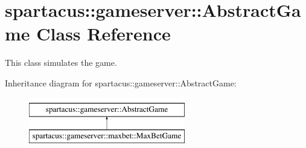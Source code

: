 \hypertarget{classspartacus_1_1gameserver_1_1AbstractGame}{
\section{\-s\-p\-a\-r\-t\-a\-c\-u\-s\-:\-:\-g\-a\-m\-e\-s\-e\-r\-v\-e\-r\-:\-:\-A\-b\-s\-t\-r\-a\-c\-t\-G\-a\-m\-e \-C\-l\-a\-s\-s \-R\-e\-f\-e\-r\-e\-n\-c\-e}
\label{classspartacus_1_1gameserver_1_1AbstractGame}
}


This class simulates the game.  


Inheritance diagram for spartacus::gameserver::AbstractGame:\begin{figure}[H]
\begin{center}
\leavevmode
\includegraphics[height=2.000000cm]{classspartacus_1_1gameserver_1_1AbstractGame}
\end{center}
\end{figure}
